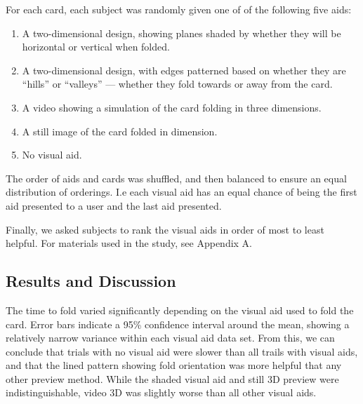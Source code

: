 For each card, each subject was randomly given one of of the following
five aids:

\begin{enumerate}
\def\labelenumi{\arabic{enumi})}
\itemsep1pt\parskip0pt
\item
  A two-dimensional design, showing planes shaded by whether they will
  be horizontal or vertical when folded.
\item
  A two-dimensional design, with edges patterned based on whether they
  are ``hills'' or ``valleys'' --- whether they fold towards or away
  from the card.
\item
  A video showing a simulation of the card folding in three dimensions.
\item
  A still image of the card folded in dimension.
\item
  No visual aid.
\end{enumerate}

The order of aids and cards was shuffled, and then balanced to ensure an
equal distribution of orderings. I.e each visual aid has an equal chance
of being the first aid presented to a user and the last aid presented.

Finally, we asked subjects to rank the visual aids in order of most to
least helpful. For materials used in the study, see Appendix A.

\subsection{Results and Discussion}\label{results-and-discussion}


The time to fold varied significantly depending on the visual aid used
to fold the card. Error bars indicate a 95\% confidence interval around
the mean, showing a relatively narrow variance within each visual aid
data set. From this, we can conclude that trials with no visual aid were
slower than all trails with visual aids, and that the lined pattern
showing fold orientation was more helpful that any other preview method.
While the shaded visual aid and still 3D preview were indistinguishable,
video 3D was slightly worse than all other visual aids.

